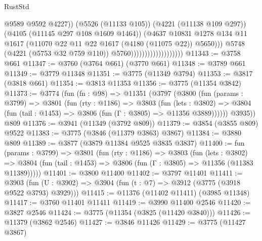 \begin{lexlean}{RustStd}
\begin{coremodule}
                                                @9589
                                                @9592
                                                @4227))
                                            (@5526 (@11133 @105))
                                            (@4221 (@11138 @109 @297))
                                            (@4105 (@11145 @297 @108 @1609 @1464))
                                            (@4637
                                              @10831
                                              @1278
                                              @134
                                              @11
                                              @1617
                                              (@11070
                                                @22
                                                @11
                                                @22
                                                @1617
                                                (@4180 (@11075 @22))
                                                @5650)))
                                          @5748
                                          (@4221 (@5753 @32 @759 @110))
                                          @5760)))))))))))))))))))
@11343 := @3758 @661
@11347 := @3760 (@3764 @661) (@3770 @661)
@11348 := @3789 @661
@11349 := @3779 @11348
@11351 := @3775 (@11349 @3794)
@11353 := @3817 (@3818 @661)
@11354 := @3813 @11353
@11356 := @3775 (@11354 @3842)
@11373 := @3774
    (fun (fn : @98) =>
    @11351
      (@3797
        (@3800
          (fun (params : @3799) =>
          @3801
            (fun (rty : @1186) =>
            @3803
              (fun (lets : @3802) =>
              @3804 (fun (tail : @1453) => @3806 (fun (Γ : @3805) => @11356 @3889))))))
        @3935))
    @809
@11376 := @3941 (@11349 (@3792 @809))
@11379 := @3854 (@3855 @809) @9522
@11383 := @3775 (@3846 (@11379 @3863) @3867)
@11384 := @3880 @809
@11389 := @3877 (@3879 @11384 @9525 @3835 @3837)
@11400 := fun (params : @3799) =>
  @3801
    (fun (rty : @1186) =>
    @3803
      (fun (lets : @3802) =>
      @3804 (fun (tail : @1453) => @3806 (fun (Γ : @3805) => @11356 (@11383 @11389)))))
@11401 := @3800 @11400
@11402 := @3797 @11401
@11411 := @3903 (fun (U : @3902) => @3904 (fun (t : @7) => @3912 (@3775 (@3918 @9522 @3793) @3929)))
@11415 := @11376 (@11402 @11411) (@3985 @11348)
@11417 := @3760 @11401 @11411
@11419 := @3990 @11400 @2546
@11420 := @3827 @2546
@11424 := @3775 (@11354 (@3825 (@11420 @3840)))
@11426 := @11379 (@3862 @2546)
@11427 := @3846 @11426
@11429 := @3775 (@11427 @3867)

\end{coremodule}
\end{lexlean}
